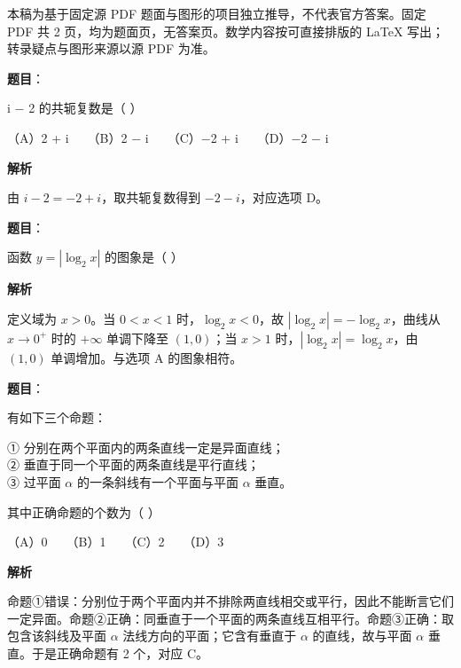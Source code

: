 

\begin{gktip}
本稿为基于固定源 PDF 题面与图形的项目独立推导，不代表官方答案。固定 PDF 共 2 页，均为题面页，无答案页。数学内容按可直接排版的 LaTeX 写出；转录疑点与图形来源以源 PDF 为准。
\end{gktip}


\begin{answer}

\textbf{题目}：

i $-$ 2 的共轭复数是（ ）

（A）2 + i　　（B）2 $-$ i　　（C）$-$2 + i　　（D）$-$2 $-$ i

\textbf{解析}

由 $i-2=-2+i$，取共轭复数得到 $-2-i$，对应选项 D。


\end{answer}
\begin{answer}

\textbf{题目}：

函数 $y=|\log_2 x|$ 的图象是（ ）
\nopagebreak[4]
\begin{center}\end{center}
\nopagebreak[4]
\textbf{解析}

定义域为 $x>0$。当 $0<x<1$ 时，$\log_2x<0$，故 $|\log_2x|=-\log_2x$，曲线从 $x\to0^+$ 时的 $+\infty$ 单调下降至 $(1,0)$；当 $x>1$ 时，$|\log_2x|=\log_2x$，由 $(1,0)$ 单调增加。与选项 A 的图象相符。


\end{answer}
\begin{answer}

\textbf{题目}：

有如下三个命题：

① 分别在两个平面内的两条直线一定是异面直线；\\
② 垂直于同一个平面的两条直线是平行直线；\\
③ 过平面 $\alpha$ 的一条斜线有一个平面与平面 $\alpha$ 垂直。

其中正确命题的个数为（ ）

（A）0　　（B）1　　（C）2　　（D）3

\textbf{解析}

命题①错误：分别位于两个平面内并不排除两直线相交或平行，因此不能断言它们一定异面。命题②正确：同垂直于一个平面的两条直线互相平行。命题③正确：取包含该斜线及平面 $\alpha$ 法线方向的平面；它含有垂直于 $\alpha$ 的直线，故与平面 $\alpha$ 垂直。于是正确命题有 2 个，对应 C。


\end{answer}
